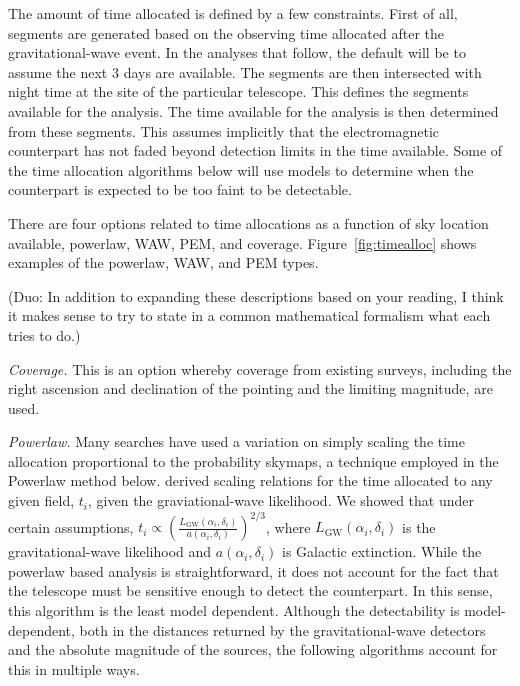 \documentclass[twocolumn]{aastex61}
\newcommand{\rednote}[1]{{\color{red} (#1)}}
\begin{document}
The amount of time allocated is defined by a few constraints. 
First of all, segments are generated based on the observing time allocated after the gravitational-wave event. In the analyses that follow, the default will be to assume the next 3 days are available.
The segments are then intersected with night time at the site of the particular telescope.
This defines the segments available for the analysis.
The time available for the analysis is then determined from these segments.
This assumes implicitly that the electromagnetic counterpart has not faded beyond detection limits in the time available. Some of the time allocation algorithms below will use models to determine when the counterpart is expected to be too faint to be detectable.

There are four options related to time allocations as a function of sky location available, powerlaw, WAW, PEM, and coverage. Figure~\ref{fig:timealloc} shows examples of the powerlaw, WAW, and PEM types.

\rednote{Duo: In addition to expanding these descriptions based on your reading, I think it makes sense to try to state in a common mathematical formalism what each tries to do.}

\emph{Coverage.} This is an option whereby coverage from existing surveys, including the right ascension and declination of the pointing and the limiting magnitude, are used.

\emph{Powerlaw.} Many searches have used a variation on simply scaling the time allocation proportional to the probability skymaps, a technique employed in the Powerlaw method below. \cite{CoSt2016a} derived scaling relations for the time allocated to any given field, $t_i$, given the graviational-wave likelihood. We showed that under certain assumptions, $t_i \propto \left(\frac{L_\textrm{GW}(\alpha_i,\delta_i)}{a(\alpha_i,\delta_i)}\right)^{2/3}$, where $L_\textrm{GW}(\alpha_i,\delta_i)$ is the gravitational-wave likelihood and $a(\alpha_i,\delta_i)$ is Galactic extinction.  While the powerlaw based analysis is straightforward, it does not account for the fact that the telescope must be sensitive enough to detect the counterpart. In this sense, this algorithm is the least model dependent. Although the detectability is model-dependent, both in the distances returned by the gravitational-wave detectors and the absolute magnitude of the sources, the following algorithms account for this in multiple ways.
\end{document}
